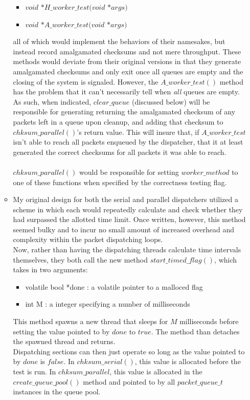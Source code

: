 \documentclass[]{article}
\begin{document}
\begin{itemize}
\begin{itemize}
\begin{itemize}
			\item $void$ $*H\_worker\_test(void$ $*args)$ 
			\item $void$ $*A\_worker\_test(void$ $*args)$
		\end{itemize}
		all of which would implement the behaviors of their namesakes, but instead record amalgamated checksums and not mere throughput. These methods would deviate from their original versions in that they generate amalgamated checksums and only exit once all queues are empty and the closing of the system is signaled. However, the $A\_worker\_test()$ method has the problem that it can't necessarily tell when \textit{all} queues are empty. As such, when indicated, $clear\_queue$ (discussed below) will be responsible for generating returning the amalgamated checksum of any packets left in a queue upon cleanup, and adding that checksum to $chksum\_parallel()$'s return value. This will insure that, if $A\_worker\_test$ isn't able to reach all packets enqueued by the dispatcher, that it at least generated the correct checksums for all packets it was able to reach.
		\\\\
		$chksum\_parallel()$ would be responsible for setting $worker\_method$ to one of these functions when specified by the correctness testing flag.
		\item My original design for both the serial and parallel dispatchers utilized a scheme in which each would repeatedly calculate and check whether they had surpassed the allotted time limit. Once written, however, this method seemed bulky and to incur no small amount of increased overhead and complexity within the packet dispatching loops.
		\\
		Now, rather than having the dispatching threads calculate time intervals themselves, they both call the new method $start\_timed\_flag()$, which takes in two arguments:
		\begin{itemize}
			\item volatile bool *done : a volatile pointer to a malloced flag
			\item int M : a integer specifying a number of milliseconds
		\end{itemize}
		This method spawns a new thread that sleeps for $M$ milliseconds before setting the value pointed to by $done$ to $true$. The method than detaches the spawned thread and returns.
		\\
		Dispatching sections can then just operate so long as the value pointed to by $done$ is $false$. In $chksum\_serial()$, this value is allocated before the test is run. In $chksum\_parallel$, this value is allocated in the $create\_queue\_pool()$ method and pointed to by all $packet\_queue\_t$ instances in the queue pool.

\end{itemize}
\end{itemize}
\end{document}
